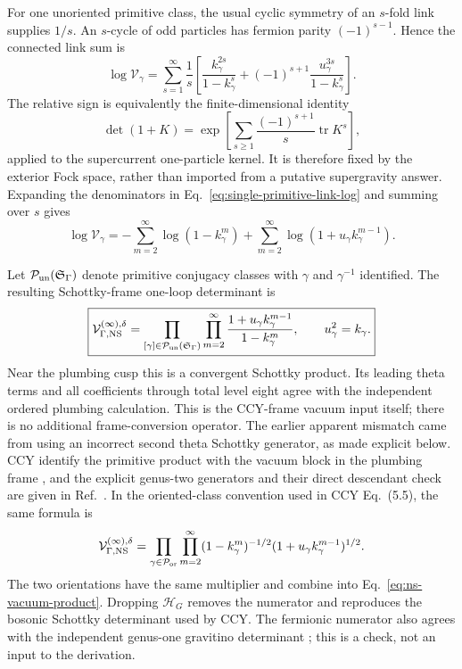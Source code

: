 \documentclass[11pt]{article}
\newcommand{\NS}{\mathrm{NS}}
\newcommand{\V}{\mathcal V}
\begin{document}
For one unoriented primitive class, the usual cyclic symmetry of an
\(s\)-fold link supplies \(1/s\).  An \(s\)-cycle of odd particles has
fermion parity \((-1)^{s-1}\).  Hence the connected link sum is
\begin{equation}
 \log \V_\gamma
 =\sum_{s=1}^{\infty}\frac1s
 \left[
  \frac{k_\gamma^{2s}}{1-k_\gamma^s}
  +(-1)^{s+1}\frac{u_\gamma^{3s}}{1-k_\gamma^s}
 \right].
 \label{eq:single-primitive-link-log}
\end{equation}
The relative sign is equivalently the finite-dimensional identity
\begin{equation}
 \det(1+K)
 =\exp\!\left[
   \sum_{s\ge1}\frac{(-1)^{s+1}}s\operatorname{tr}K^s
  \right],
 \label{eq:exterior-fock-determinant}
\end{equation}
applied to the supercurrent one-particle kernel.  It is therefore fixed by
the exterior Fock space, rather than imported from a putative supergravity
answer.  Expanding the denominators in
Eq.~\eqref{eq:single-primitive-link-log} and summing over \(s\) gives
\begin{equation}
 \log\V_\gamma
 =-\sum_{m=2}^{\infty}\log(1-k_\gamma^m)
  +\sum_{m=2}^{\infty}
    \log(1+u_\gamma k_\gamma^{m-1}).
 \label{eq:single-primitive-resummation}
\end{equation}

Let \(\mathcal P_{\rm un}(\mathfrak S_\Gamma)\) denote primitive conjugacy
classes with \(\gamma\) and \(\gamma^{-1}\) identified.  The resulting
Schottky-frame one-loop determinant is
\begin{equation}
\boxed{
 \V_{\Gamma,\NS}^{(\infty),\delta}
 =\prod_{[\gamma]\in\mathcal P_{\rm un}(\mathfrak S_\Gamma)}
   \prod_{m=2}^{\infty}
   \frac{1+u_\gamma k_\gamma^{m-1}}
        {1-k_\gamma^m},
 \qquad u_\gamma^2=k_\gamma.}
 \label{eq:ns-vacuum-product}
\end{equation}
Near the plumbing cusp this is a convergent Schottky product.  Its leading
theta terms and all coefficients through total level eight agree with the
independent ordered plumbing calculation.  This is the CCY-frame vacuum
input itself; there is no additional frame-conversion operator.  The earlier
apparent mismatch came from using an incorrect second theta Schottky
generator, as made explicit below.  CCY identify the primitive product with
the vacuum block in the plumbing frame
\cite{ChoCollierYin2017Recursive}, and the explicit genus-two generators and
their direct descendant check are given in
Ref.~\cite{CollierEberhardtZhang2024VirasoroTQFT}.
In the oriented-class convention used in CCY Eq.~(5.5), the same formula is
\begin{equation}
 \V_{\Gamma,\NS}^{(\infty),\delta}
 =\prod_{\gamma\in\mathcal P_{\rm or}}
   \prod_{m=2}^{\infty}
   (1-k_\gamma^m)^{-1/2}
   (1+u_\gamma k_\gamma^{m-1})^{1/2}.
 \label{eq:ns-vacuum-product-oriented}
\end{equation}
The two orientations have the same multiplier and combine into
Eq.~\eqref{eq:ns-vacuum-product}.  Dropping \(\mathcal H_G\) removes the
numerator and reproduces the bosonic Schottky determinant used by CCY.  The fermionic numerator
also agrees with the independent genus-one gravitino determinant
\cite{ZhangZhang2012Supergravity}; this is a check, not an input to the
derivation.
\end{document}
